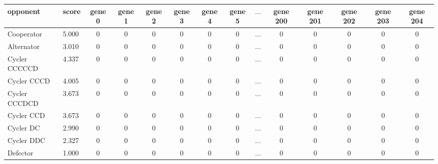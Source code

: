 \begin{tabular}{llcccccccccccc}
\toprule
     opponent &  score &  gene 0 &  gene 1 &  gene 2 &  gene 3 &  gene 4 &  gene 5 &  \(\dots\) & gene 200 &  gene 201 &  gene 202 &  gene 203 &  gene 204 \\
\midrule
   Cooperator &  5.000 &       0 &       0 &       0 &       0 &    0 &       0 &  \(\dots\) &        0 &         0 &         0 &         0 &         0 \\
   Alternator &  3.010 &       0 &       0 &       0 &       0 &    0 &       0 &  \(\dots\) &        0 &         0 &         0 &         0 &         0 \\
Cycler CCCCCD &  4.337 &       0 &       0 &       0 &       0 &    0 &       0 &  \(\dots\) &        0 &         0 &         0 &         0 &         0 \\
  Cycler CCCD &  4.005 &       0 &       0 &       0 &       0 &    0 &       0 &  \(\dots\) &        0 &         0 &         0 &         0 &         0 \\
Cycler CCCDCD &  3.673 &       0 &       0 &       0 &       0 &    0 &       0 &  \(\dots\) &        0 &         0 &         0 &         0 &         0 \\
   Cycler CCD &  3.673 &       0 &       0 &       0 &       0 &    0 &       0 &  \(\dots\) &        0 &         0 &         0 &         0 &         0 \\
    Cycler DC &  2.990 &       0 &       0 &       0 &       0 &    0 &       0 &  \(\dots\) &        0 &         0 &         0 &         0 &         0 \\
   Cycler DDC &  2.327 &       0 &       0 &       0 &       0 &    0 &       0 &  \(\dots\) &        0 &         0 &         0 &         0 &         0 \\
     Defector &  1.000 &       0 &       0 &       0 &       0 &    0 &       0 &  \(\dots\) &        0 &         0 &         0 &         0 &         0 \\
\bottomrule
\end{tabular}
